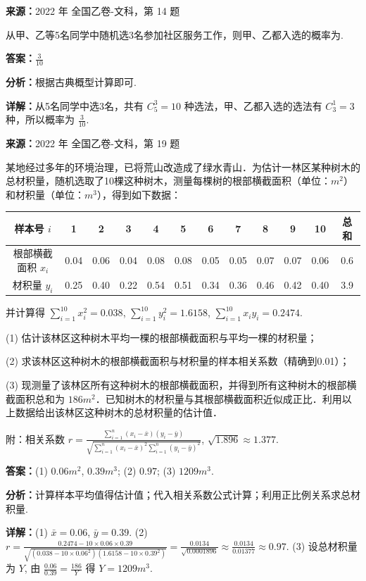 \begin{question}[points=5]
\textbf{来源：}2022 年 全国乙卷-文科，第 14 题\par
从甲、乙等5名同学中随机选3名参加社区服务工作，则甲、乙都入选的概率为.
\fillin[{$\frac{3}{10}$}]
\begin{solution}
\textbf{答案：}$\frac{3}{10}$

\textbf{分析：}根据古典概型计算即可.

\textbf{详解：}从5名同学中选3名，共有 $C_5^3=10$ 种选法，甲、乙都入选的选法有 $C_3^1=3$ 种，所以概率为 $\frac{3}{10}$.
\end{solution}
\end{question}

\begin{question}[points=12]
\textbf{来源：}2022 年 全国乙卷-文科，第 19 题\par
某地经过多年的环境治理，已将荒山改造成了绿水青山．为估计一林区某种树木的总材积量，随机选取了10棵这种树木，测量每棵树的根部横截面积（单位：$m^2$）和材积量（单位：$m^3$），得到如下数据：

\begin{tabular}{c|cccccccccc|c}

样本号 $i$ & 1 & 2 & 3 & 4 & 5 & 6 & 7 & 8 & 9 & 10 & 总和 \\ \hline

根部横截面积 $x_i$ & 0.04 & 0.06 & 0.04 & 0.08 & 0.08 & 0.05 & 0.05 & 0.07 & 0.07 & 0.06 & 0.6 \\

材积量 $y_i$ & 0.25 & 0.40 & 0.22 & 0.54 & 0.51 & 0.34 & 0.36 & 0.46 & 0.42 & 0.40 & 3.9 \\

\end{tabular}

并计算得 $\sum_{i=1}^{10} x_i^2 = 0.038$, $\sum_{i=1}^{10} y_i^2 = 1.6158$, $\sum_{i=1}^{10} x_i y_i = 0.2474$.

(1) 估计该林区这种树木平均一棵的根部横截面积与平均一棵的材积量；

(2) 求该林区这种树木的根部横截面积与材积量的样本相关系数（精确到0.01）；

(3) 现测量了该林区所有这种树木的根部横截面积，并得到所有这种树木的根部横截面积总和为 $186 m^2$．已知树木的材积量与其根部横截面积近似成正比．利用以上数据给出该林区这种树木的总材积量的估计值．

附：相关系数 $r = \frac{\sum_{i=1}^{n}(x_i-\bar{x})(y_i-\bar{y})}{\sqrt{\sum_{i=1}^{n}(x_i-\bar{x})^2 \sum_{i=1}^{n}(y_i-\bar{y})^2}}$, $\sqrt{1.896}\approx1.377$.
\begin{solution}
\textbf{答案：}(1) $0.06m^2$, $0.39m^3$; (2) $0.97$; (3) $1209m^3$.

\textbf{分析：}计算样本平均值得估计值；代入相关系数公式计算；利用正比例关系求总材积量.

\textbf{详解：}(1) $\bar{x}=0.06$, $\bar{y}=0.39$.
(2) $r = \frac{0.2474-10\times0.06\times0.39}{\sqrt{(0.038-10\times0.06^2)(1.6158-10\times0.39^2)}} = \frac{0.0134}{\sqrt{0.0001896}} \approx \frac{0.0134}{0.01377} \approx 0.97$.
(3) 设总材积量为 $Y$, 由 $\frac{0.06}{0.39}=\frac{186}{Y}$ 得 $Y=1209m^3$.
\end{solution}
\end{question}

